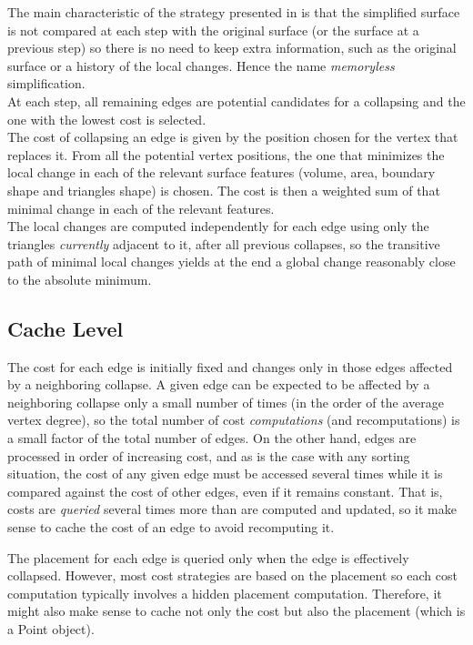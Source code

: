 The main characteristic of the strategy presented in \cite{cgal:lt-fmeps-98,cgal:lt-ems-99}
is that the simplified surface is not compared at each step with the original surface (or the surface at a previous step) so there is no need to keep extra information, such as the original surface or a history of the local changes. Hence the name {\em memoryless} simplification.\\
At each step, all remaining edges are potential candidates for a collapsing and the one with the lowest cost is selected.\\
The cost of collapsing an edge is given by the position chosen for the vertex that replaces it. From all the potential vertex positions, the one that minimizes the local change in each of the relevant surface features (volume, area, boundary shape and triangles shape) is chosen. The cost is then a weighted sum of that minimal change in each of the relevant features.\\
The local changes are computed independently for each edge using only the triangles {\em currently} adjacent to it, after all previous collapses, so the transitive path of minimal local changes yields at the end a global change reasonably close to the absolute minimum.

\subsection{Cache Level}

The cost for each edge is initially fixed and changes only in those edges 
affected by a neighboring collapse. A given edge can be expected to be 
affected by a neighboring collapse only a small number of times 
(in the order of the average vertex degree), so the total number of 
cost {\em computations} (and recomputations) is a small factor of
the total number of edges. 
On the other hand, edges are processed in order of increasing cost, and as is 
the case with any sorting situation, the cost of any given edge must be accessed 
several times while it is compared against the cost of other edges, even if it 
remains constant. That is, costs are {\em queried} several times more than are computed 
and updated, so it make sense to cache the cost of an edge to avoid recomputing it.

The placement for each edge is queried only when the edge is effectively collapsed. 
However, most cost strategies are based on the placement so each cost computation 
typically involves a hidden placement computation. Therefore, it might also make sense
to cache not only the cost but also the placement (which is a Point object).

